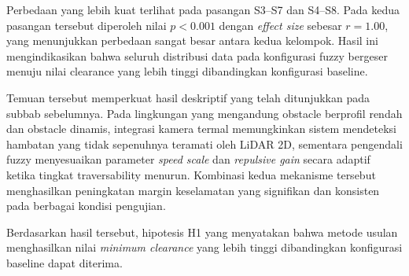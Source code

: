 Perbedaan yang lebih kuat terlihat pada pasangan S3--S7
dan S4--S8. Pada kedua pasangan tersebut diperoleh
nilai $p<0.001$ dengan \textit{effect size} sebesar
$r=1.00$, yang menunjukkan perbedaan sangat besar antara
kedua kelompok. Hasil ini mengindikasikan bahwa seluruh
distribusi data pada konfigurasi fuzzy bergeser menuju
nilai clearance yang lebih tinggi dibandingkan konfigurasi
baseline.

Temuan tersebut memperkuat hasil deskriptif yang telah
ditunjukkan pada subbab sebelumnya. Pada lingkungan yang
mengandung obstacle berprofil rendah dan obstacle dinamis,
integrasi kamera termal memungkinkan sistem mendeteksi
hambatan yang tidak sepenuhnya teramati oleh LiDAR 2D,
sementara pengendali fuzzy menyesuaikan parameter
\textit{speed scale} dan \textit{repulsive gain}
secara adaptif ketika tingkat traversability menurun.
Kombinasi kedua mekanisme tersebut menghasilkan peningkatan
margin keselamatan yang signifikan dan konsisten pada
berbagai kondisi pengujian.

Berdasarkan hasil tersebut, hipotesis H1 yang menyatakan
bahwa metode usulan menghasilkan nilai \textit{minimum clearance}
yang lebih tinggi dibandingkan konfigurasi baseline dapat
diterima.